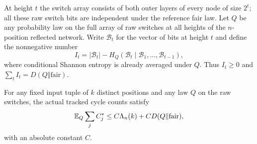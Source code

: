 At height $t$ the switch array consists of both outer layers of every
node of size $2^t$; all these raw switch bits are independent under the
reference fair law.  Let $Q$ be any probability law on the full array
of raw switches at all heights of the $n$-position reflected network.
Write $\mathcal B_t$ for the vector of bits at height $t$ and define the
nonnegative number
\[
 I_t=|\mathcal B_t|-H_Q(\mathcal B_t\mid\mathcal B_1,\ldots,
 \mathcal B_{t-1}),
\]
where conditional Shannon entropy is already averaged under $Q$.  Thus $I_t\ge0$ and $\sum_tI_t=D(Q\Vert\mathrm{fair})$.
\begin{proposition}
\label{rec:entropy-deficit}
For any fixed input tuple of $k$ distinct positions and any law $Q$
on the raw switches, the actual tracked cycle counts satisfy
\begin{equation}\label{rec:cycle-tilted-entropy}
 \mathbb E_Q\sum_j C_j^*\le C\Lambda_n(k)+C D(Q\Vert\mathrm{fair}),
\end{equation}
with an absolute constant $C$.
\end{proposition}
